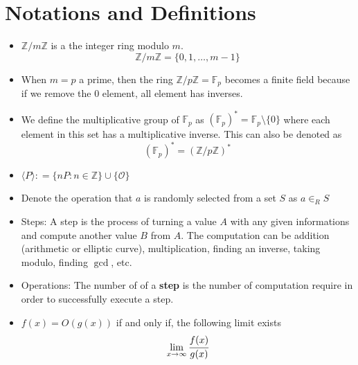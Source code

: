 \documentclass[a4 paper]{article}
\newcommand{\?}{\stackrel{?}{=}}
\begin{document}
\section*{Notations and Definitions}
\begin{itemize}
    \item $ \mathbb{Z} / m \mathbb{Z} $ is a the integer ring modulo $ m $.  
    $$ \mathbb{Z} / m \mathbb{Z} = \{0,1 , \dots, m-1\} $$
    \item When $ m = p $ a prime, then the ring $ \mathbb{Z}/ p \mathbb{Z} = \mathbb{F}_p  $ becomes a finite field because if we remove the $ 0 $ element, all element has inverses. 
    \item We define the multiplicative group of $ \mathbb{F}_p  $ as $ (\mathbb{F}_p)^* = \mathbb{F}_p \setminus \{0\} $ where each element in this set has a multiplicative inverse. This can also be denoted as 
    $$ (\mathbb{F}_p)^* = ( \mathbb{Z} / p \mathbb{Z})^* $$
    \item $ \langle P \rangle : = \{nP : n \in \mathbb{Z}\}\cup \{\mathcal{O}\} $ 
    \item Denote the operation that $ a $ is randomly selected from a set $ S $ as $ a \in _R S $
    \item Steps: A step is the process of turning a value $ A $ with any given informations and compute another value $ B $ from $ A $. The computation can be addition (arithmetic or elliptic curve), multiplication, finding an inverse, taking modulo, finding $ \gcd$, etc. 
    \item Operations: The number of of a \textbf{step} is the number of computation require in order to successfully execute a step. 
    \item $ f(x) = O(g(x)) $ if and only if, the following limit exists 
    $$ \lim\limits_{x \to \infty } \cfrac{f(x)}{g(x)}  $$

\end{itemize} 
 
\newpage
\fancyhead[R]{\leftmark}
\end{document}

